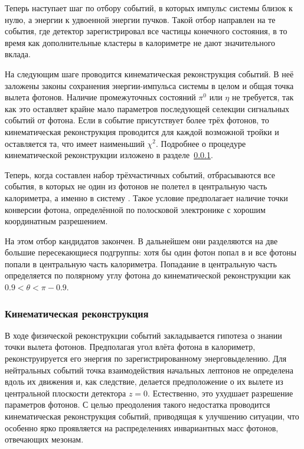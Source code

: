 Теперь наступает шаг по отбору событий, в которых импульс системы близок к нулю,
а энергии к удвоенной энергии пучков.
Такой отбор направлен на те события,
где детектор зарегистрировал все частицы конечного состояния,
в то время как дополнительные кластеры в калориметре не дают значительного вклада.

На следующим шаге проводится кинематическая реконструкция событий.
В неё заложены законы сохранения энергии-импульса системы в целом и общая точка вылета фотонов.
Наличие промежуточных состояний $\pi^0$ или $\eta$ не требуется,
так как это оставляет крайне мало параметров последующей селекции сигнальных событий от фотона.
Если в событие присутствует более трёх фотонов,
то кинематическая реконструкция проводится для каждой возможной тройки и оставляется та,
что имеет наименьший $\chi^2$.
Подробнее о процедуре кинематической реконструкции изложено в разделе~\ref{sec:kf}.

Теперь, 
когда составлен набор трёхчастичных событий, 
отбрасываются все события, 
в которых не один из фотонов не полетел в центральную часть калориметра, 
а именно в систему . 
Такое условие предполагает наличие точки конверсии фотона,
определённой по полосковой электронике  с хорошим координатным разрешением.

На этом отбор кандидатов закончен. 
В дальнейшем они разделяются на две большие пересекающиеся подгруппы: 
хотя бы один фотон попал в  и все фотоны попали в центральную часть калориметра.
Попадание в центральную часть определяется по полярному углу фотона до кинематической реконструкции как $0.9 < \theta < \pi - 0.9$.



\subsubsection{Кинематическая реконструкция}
\label{sec:kf}

В ходе физической реконструкции событий закладывается гипотеза о знании точки вылета фотонов.
Предполагая угол влёта фотона в калориметр,
реконструируется его энергия по зарегистрированному энерговыделению.
Для нейтральных событий точка взаимодействия начальных лептонов не определена вдоль их движения и,
как следствие,
делается предположение о их вылете из центральной плоскости детектора $z = 0$.
Естественно,
это ухудшает разрешение параметров фотонов.
С целью преодоления такого недостатка проводится кинематическая реконструкция событий,
приводящая к улучшению ситуации,
что особенно ярко проявляется на распределениях инвариантных масс фотонов,
отвечающих мезонам.


